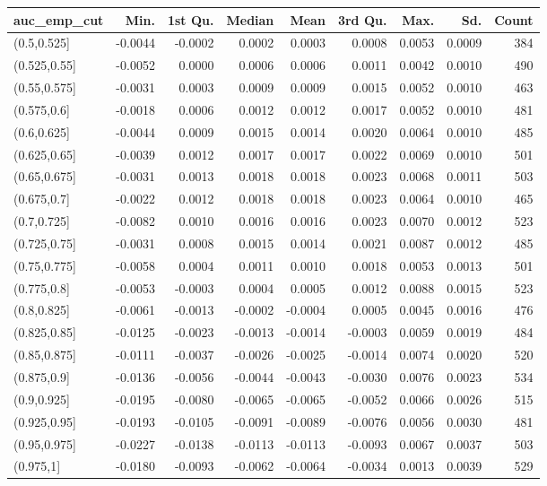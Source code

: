 
\begin{tabular}{l|r|r|r|r|r|r|r|r}
\hline
auc\_emp\_cut & Min. & 1st Qu. & Median & Mean & 3rd Qu. & Max. & Sd. & Count\\
\hline
(0.5,0.525] & -0.0044 & -0.0002 & 0.0002 & 0.0003 & 0.0008 & 0.0053 & 0.0009 & 384\\
\hline
(0.525,0.55] & -0.0052 & 0.0000 & 0.0006 & 0.0006 & 0.0011 & 0.0042 & 0.0010 & 490\\
\hline
(0.55,0.575] & -0.0031 & 0.0003 & 0.0009 & 0.0009 & 0.0015 & 0.0052 & 0.0010 & 463\\
\hline
(0.575,0.6] & -0.0018 & 0.0006 & 0.0012 & 0.0012 & 0.0017 & 0.0052 & 0.0010 & 481\\
\hline
(0.6,0.625] & -0.0044 & 0.0009 & 0.0015 & 0.0014 & 0.0020 & 0.0064 & 0.0010 & 485\\
\hline
(0.625,0.65] & -0.0039 & 0.0012 & 0.0017 & 0.0017 & 0.0022 & 0.0069 & 0.0010 & 501\\
\hline
(0.65,0.675] & -0.0031 & 0.0013 & 0.0018 & 0.0018 & 0.0023 & 0.0068 & 0.0011 & 503\\
\hline
(0.675,0.7] & -0.0022 & 0.0012 & 0.0018 & 0.0018 & 0.0023 & 0.0064 & 0.0010 & 465\\
\hline
(0.7,0.725] & -0.0082 & 0.0010 & 0.0016 & 0.0016 & 0.0023 & 0.0070 & 0.0012 & 523\\
\hline
(0.725,0.75] & -0.0031 & 0.0008 & 0.0015 & 0.0014 & 0.0021 & 0.0087 & 0.0012 & 485\\
\hline
(0.75,0.775] & -0.0058 & 0.0004 & 0.0011 & 0.0010 & 0.0018 & 0.0053 & 0.0013 & 501\\
\hline
(0.775,0.8] & -0.0053 & -0.0003 & 0.0004 & 0.0005 & 0.0012 & 0.0088 & 0.0015 & 523\\
\hline
(0.8,0.825] & -0.0061 & -0.0013 & -0.0002 & -0.0004 & 0.0005 & 0.0045 & 0.0016 & 476\\
\hline
(0.825,0.85] & -0.0125 & -0.0023 & -0.0013 & -0.0014 & -0.0003 & 0.0059 & 0.0019 & 484\\
\hline
(0.85,0.875] & -0.0111 & -0.0037 & -0.0026 & -0.0025 & -0.0014 & 0.0074 & 0.0020 & 520\\
\hline
(0.875,0.9] & -0.0136 & -0.0056 & -0.0044 & -0.0043 & -0.0030 & 0.0076 & 0.0023 & 534\\
\hline
(0.9,0.925] & -0.0195 & -0.0080 & -0.0065 & -0.0065 & -0.0052 & 0.0066 & 0.0026 & 515\\
\hline
(0.925,0.95] & -0.0193 & -0.0105 & -0.0091 & -0.0089 & -0.0076 & 0.0056 & 0.0030 & 481\\
\hline
(0.95,0.975] & -0.0227 & -0.0138 & -0.0113 & -0.0113 & -0.0093 & 0.0067 & 0.0037 & 503\\
\hline
(0.975,1] & -0.0180 & -0.0093 & -0.0062 & -0.0064 & -0.0034 & 0.0013 & 0.0039 & 529\\
\hline
\end{tabular}
